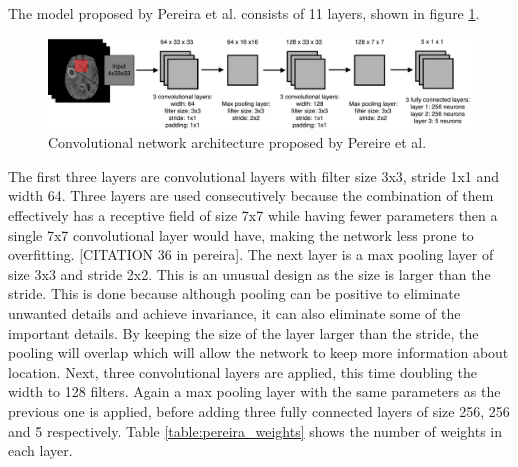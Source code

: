 \documentclass[12pt,a4paper,twoside,openright]{report}
\begin{document}
The model proposed by Pereira et al. \cite{pereira} consists of 11 layers, shown in figure \ref{fig:pereira_model}. 
\begin{figure}
	\centering
	\includegraphics[scale=0.43]{pereira_model}
	\caption{Convolutional network architecture proposed by Pereire et al.}
	\label{fig:pereira_model}
\end{figure}
The first three layers are convolutional layers with filter size 3x3, stride 1x1 and width 64. Three layers are used consecutively because the combination of them  effectively has a receptive field of size 7x7 while having fewer parameters then a single 7x7 convolutional layer would have, making the network less prone to overfitting. [CITATION 36 in pereira]. The next layer is a max pooling layer of size 3x3 and stride 2x2. This is an unusual design as the size is larger than the stride. This is done because although pooling can be positive to eliminate unwanted details and achieve invariance, it can also eliminate some of the important details. By keeping the size of the layer larger than the stride, the pooling will overlap which will allow the network to keep more information about location. Next, three convolutional layers are applied, this time doubling the width to 128 filters. Again a max pooling layer with the same parameters as the previous one is applied, before adding three fully connected layers of size 256, 256 and 5 respectively. Table \ref{table:pereira_weights} shows the number of weights in each layer. 
\end{document}
